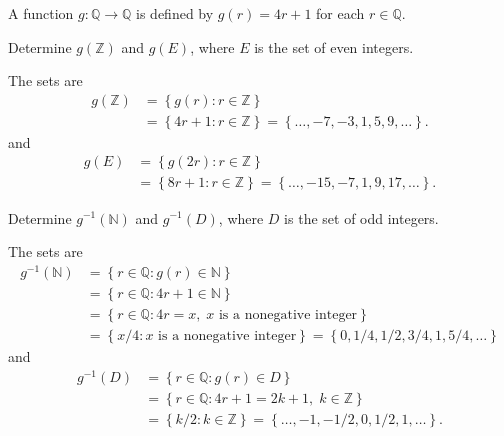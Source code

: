 \documentclass[12pt]{article}
\newcommand{\N}{\mathbb{N}}
\newcommand{\Z}{\mathbb{Z}}
\newcommand{\Q}{\mathbb{Q}}
\newenvironment{problem}[2][Problem]{\begin{trivlist} \item[\hskip \labelsep {\bfseries #1}\hskip \labelsep {\bfseries #2.}]}{\end{trivlist}}
\newenvironment{solution}[2][Solution]{\begin{trivlist} \item[\hskip \labelsep {\bfseries #1}\hskip \labelsep {\bfseries #2.}]}{\end{trivlist}}
\begin{document}
    \begin{problem}{10}
      A function $g:\Q\to \Q$ is defined by $g(r) = 4r+1$ for each $r\in \Q$.
      \begin{enumerate}[label=(\alph*)]
	\item Determine $g(\Z)$ and $g(E)$, where $E$ is the set of even integers.
	  \begin{solution}{(a)}
	    The sets are
    \begin{align*}
      g(\Z) &= \left\{g(r):r\in\Z \right\}\\
    &= \left\{4r+1:r\in\Z \right\}=\left\{\dots,-7,-3,1,5,9,\dots\right\}.
    \end{align*}
    and
    \begin{align*}
      g(E) &= \left\{g(2r):r\in\Z\right\}\\
      &= \left\{8r+1:r\in\Z\right\}=\left\{\dots,-15,-7,1,9,17,\dots\right\}.
    \end{align*}
    \end{solution}
	\item Determine $g^{-1}(\N)$ and $g^{-1}(D)$, where $D$ is the set of odd integers.
    \begin{solution}{(b)}
      The sets are
    \begin{align*}
      g^{-1}(\N) &= \left\{r\in\Q:g(r)\in\N\right\}\\
      &= \left\{r\in\Q:4r+1\in\N\right\}\\
      &= \left\{r\in\Q:4r=x, \; x\text{ is a nonegative integer}\right\}\\
      &= \left\{x/4: x\text{ is a nonegative integer}\right\} = \left\{0,1/4,1/2,3/4,1,5/4,\dots\right\}
    \end{align*}
    and
    \begin{align*}
      g^{-1}(D) &= \left\{r\in\Q:g(r)\in D\right\}\\
      &= \left\{r\in\Q: 4r+1=2k+1,\; k\in\Z\right\}\\
      &= \left\{k/2: k\in\Z\right\} = \left\{\dots,-1,-1/2,0,1/2,1,\dots\right\}.
    \end{align*}
    \end{solution}
    \end{enumerate}
    \end{problem}
\end{document}
